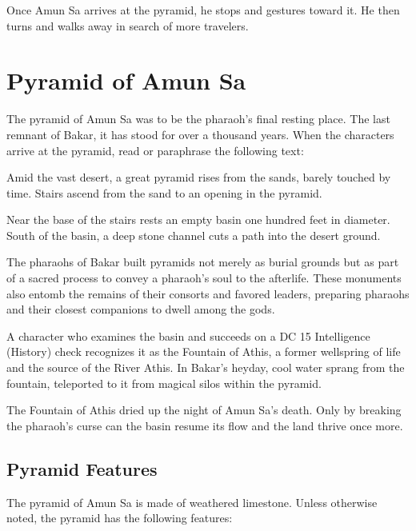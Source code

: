 \documentclass[10pt,a4paper,twoside,bg=print,twocolumn,openany,nodeprecatedcode]{dndbook}
\begin{document}
Once Amun Sa arrives at the pyramid, he stops and gestures toward it. He then turns and walks away in search of more travelers.

\section{Pyramid of Amun Sa}
The pyramid of Amun Sa was to be the pharaoh's final resting place. The last remnant of Bakar, it has stood for over a thousand years. When the characters arrive at the pyramid, read or paraphrase the following text:

\begin{DndReadAloud}{}
Amid the vast desert, a great pyramid rises from the sands, barely touched by time. Stairs ascend from the sand to an opening in the pyramid.

Near the base of the stairs rests an empty basin one hundred feet in diameter. South of the basin, a deep stone channel cuts a path into the desert ground.

\end{DndReadAloud}

The pharaohs of Bakar built pyramids not merely as burial grounds but as part of a sacred process to convey a pharaoh's soul to the afterlife. These monuments also entomb the remains of their consorts and favored leaders, preparing pharaohs and their closest companions to dwell among the gods.

A character who examines the basin and succeeds on a DC 15 Intelligence (History) check recognizes it as the Fountain of Athis, a former wellspring of life and the source of the River Athis. In Bakar's heyday, cool water sprang from the fountain, teleported to it from magical silos within the pyramid.

The Fountain of Athis dried up the night of Amun Sa's death. Only by breaking the pharaoh's curse can the basin resume its flow and the land thrive once more.

\subsection{Pyramid Features}
The pyramid of Amun Sa is made of weathered limestone. Unless otherwise noted, the pyramid has the following features:
\end{document}
